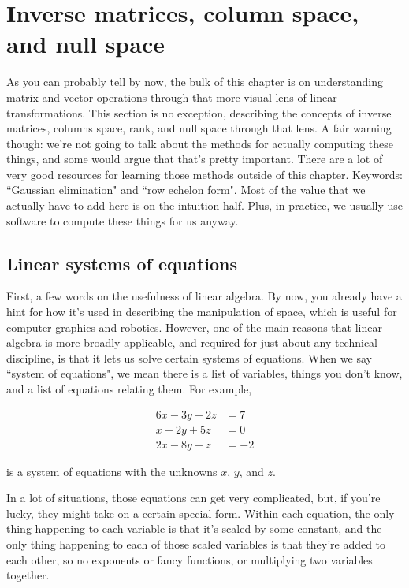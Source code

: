 \section{Inverse matrices, column space, and null space}

As you can probably tell by now, the bulk of this chapter is on understanding
matrix and vector operations through that more visual lens of linear
transformations. This section is no exception, describing the concepts of
inverse matrices, columns space, rank, and null space through that lens. A fair
warning though: we're not going to talk about the methods for actually computing
these things, and some would argue that that's pretty important. There are a lot
of very good resources for learning those methods outside of this chapter.
Keywords: ``Gaussian elimination" and ``row echelon form". Most of the value
that we actually have to add here is on the intuition half. Plus, in practice,
we usually use software to compute these things for us anyway.

\subsection{Linear systems of equations}

First, a few words on the usefulness of linear algebra. By now, you already have
a hint for how it's used in describing the manipulation of space, which is
useful for computer graphics and robotics. However, one of the main reasons that
linear algebra is more broadly applicable, and required for just about any
technical discipline, is that it lets us solve certain systems of equations.
When we say ``system of equations", we mean there is a list of variables, things
you don't know, and a list of equations relating them. For example,

\begin{align*}
  6x - 3y + 2z &= 7 \\
  x + 2y + 5z &= 0 \\
  2x - 8y - z &= -2
\end{align*}

is a system of equations with the unknowns $x$, $y$, and $z$.

In a lot of situations, those equations can get very complicated, but, if you're
lucky, they might take on a certain special form. Within each equation, the only
thing happening to each variable is that it's scaled by some constant, and the
only thing happening to each of those scaled variables is that they're added to
each other, so no exponents or fancy functions, or multiplying two variables
together.

